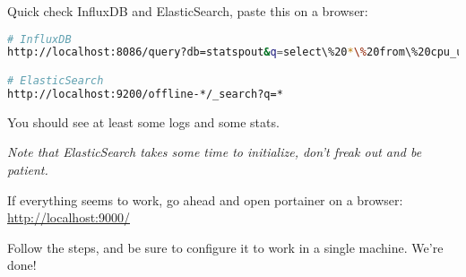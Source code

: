 Quick check InfluxDB and ElasticSearch, paste this on a browser:

\begin{lstlisting}[language=bash]
# InfluxDB
http://localhost:8086/query?db=statspout&q=select\%20*\%20from\%20cpu_usage\%20where\%20container=\%27influxdb\%27

# ElasticSearch
http://localhost:9200/offline-*/_search?q=*
\end{lstlisting}

You should see at least some logs and some stats.

\begin{center}
\textit{Note that ElasticSearch takes some time to initialize, don't freak out and be patient.}
\end{center}

If everything seems to work, go ahead and open portainer on a browser: \url{http://localhost:9000/}

Follow the steps, and be sure to configure it to work in a single machine. We're done!